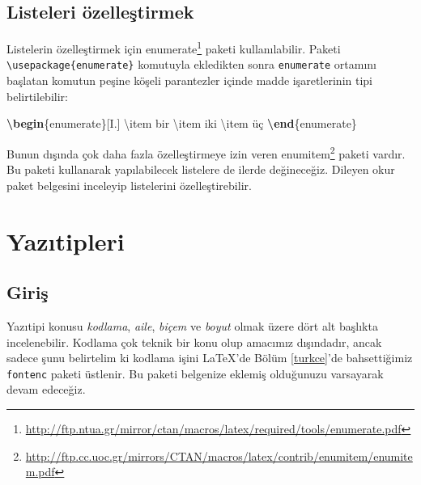\documentclass[
  10pt,
]{scrbook}
\newenvironment{Shaded}{\begin{snugshade}}{\end{snugshade}}
\newcommand{\ExtensionTok}[1]{#1}
\newcommand{\FunctionTok}[1]{\textcolor[rgb]{0.00,0.00,0.00}{#1}}
\newcommand{\KeywordTok}[1]{\textcolor[rgb]{0.13,0.29,0.53}{\textbf{#1}}}
\newcommand{\NormalTok}[1]{#1}
\renewcommand{\href}[2]{#2\footnote{\url{#1}}}
\theoremstyle{definition}
\theoremstyle{definition}
\theoremstyle{definition}
\theoremstyle{definition}
\theoremstyle{remark}
\begin{document}
\hypertarget{listeleri-uxf6zelleux15ftirmek}{%
\subsection{Listeleri özelleştirmek}\label{listeleri-uxf6zelleux15ftirmek}}

Listelerin özelleştirmek için \href{http://ftp.ntua.gr/mirror/ctan/macros/latex/required/tools/enumerate.pdf}{enumerate} paketi kullanılabilir. Paketi \texttt{\textbackslash{}usepackage\{enumerate\}} komutuyla ekledikten sonra \texttt{enumerate} ortamını başlatan komutun peşine köşeli parantezler içinde madde işaretlerinin tipi belirtilebilir:

\begin{Shaded}
\begin{Highlighting}[]
\KeywordTok{\textbackslash{}begin}\NormalTok{\{}\ExtensionTok{enumerate}\NormalTok{\}[I.]}
 \FunctionTok{\textbackslash{}item}\NormalTok{ bir}
 \FunctionTok{\textbackslash{}item}\NormalTok{ iki }
 \FunctionTok{\textbackslash{}item}\NormalTok{ üç}
\KeywordTok{\textbackslash{}end}\NormalTok{\{}\ExtensionTok{enumerate}\NormalTok{\}}
\end{Highlighting}
\end{Shaded}

Bunun dışında çok daha fazla özelleştirmeye izin veren \href{http://ftp.cc.uoc.gr/mirrors/CTAN/macros/latex/contrib/enumitem/enumitem.pdf}{enumitem} paketi vardır. Bu paketi kullanarak yapılabilecek listelere de ilerde değineceğiz. Dileyen okur paket belgesini inceleyip listelerini özelleştirebilir.

\hypertarget{yazux131tipleri}{%
\section{Yazıtipleri}\label{yazux131tipleri}}

\hypertarget{giriux15f}{%
\subsection{Giriş}\label{giriux15f}}

Yazıtipi konusu \emph{kodlama}, \emph{aile}, \emph{biçem} ve \emph{boyut} olmak üzere dört alt başlıkta incelenebilir. Kodlama çok teknik bir konu olup amacımız dışındadır, ancak sadece şunu belirtelim ki kodlama işini LaTeX'de Bölüm \ref{turkce}'de bahsettiğimiz \texttt{fontenc} paketi üstlenir. Bu paketi belgenize eklemiş olduğunuzu varsayarak devam edeceğiz.
\end{document}
